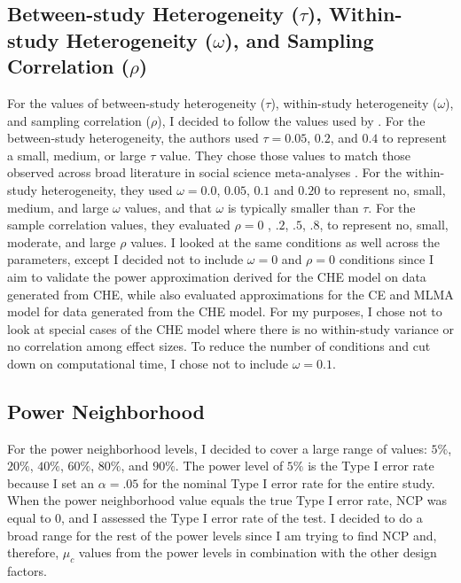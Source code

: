 \subsection{Between-study Heterogeneity \texorpdfstring{($\tau$)}{ }, Within-study Heterogeneity \texorpdfstring{($\omega$)}{ }, and Sampling Correlation \texorpdfstring{($\rho$)}{ }}
For the values of between-study heterogeneity ($\tau$), within-study heterogeneity ($\omega$), and sampling correlation ($\rho$), I decided to follow the values used by \textcite{vembye2023}. For the between-study heterogeneity, the authors used $\tau = 0.05$, $0.2$, and $0.4$ to represent a small, medium, or large  $\tau$ value. They chose those values to match those observed across broad literature in social science meta-analyses \autocite{LindenAudreyHelen2021HoRR}. For the within-study heterogeneity, they used $\omega = 0.0$, $0.05$, $0.1$ and $0.20$ to represent no, small, medium, and large $\omega$ values, and that $\omega$ is typically smaller than $\tau$. For the sample correlation values, they evaluated $\rho = 0$ , $.2$, $.5$, $.8$, to represent no, small, moderate, and large $\rho$ values. I looked at the same conditions as well across the parameters, except I decided not to include  $\omega = 0$ and $\rho = 0$ conditions since I aim to validate the power approximation derived for the CHE model on data generated from CHE, while \textcite{vembye2023} also evaluated approximations for the CE and MLMA model for data generated from the CHE model. For my purposes, I chose not to look at special cases of the CHE model where there is no within-study variance or no correlation among effect sizes. To reduce the number of conditions and cut down on computational time, I chose not to include $\omega=0.1$. 

\subsection{Power Neighborhood}
For the power neighborhood levels, I decided to cover a large range of values: $5\%$, $20\%$, $40\%$, $60\%$, $80\%$, and $90\%$. The power level of $5\%$ is the Type I error rate because I set an $\alpha = .05$ for the nominal Type I error rate for the entire study. When the power neighborhood value equals the true Type I error rate, NCP was equal to 0, and I assessed the Type I error rate of the test. I decided to do a broad range for the rest of the power levels since I am trying to find NCP and, therefore, $\mu_c$ values from the power levels in combination with the other design factors.

